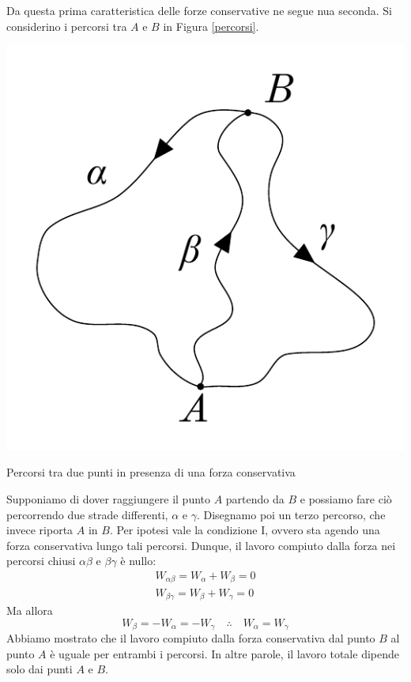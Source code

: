 \noindent Da questa prima caratteristica delle forze conservative ne segue nua
seconda. Si considerino i percorsi tra $A$ e $B$ in Figura \ref{percorsi}.
\begin{marginfigure}
    \centering
    \includegraphics[width = \marginparwidth]{figures/circ.pdf}
    \caption{Percorsi tra due punti in presenza di una forza conservativa}
    \label{percorsi}
\end{marginfigure}
Supponiamo di dover raggiungere il punto $A$ partendo da $B$ e possiamo fare
ciò percorrendo due strade differenti, $\alpha$ e $\gamma$. Disegnamo poi un
terzo percorso, che invece riporta $A$ in $B$.
Per ipotesi vale la condizione I, ovvero sta agendo una forza conservativa
lungo tali percorsi. Dunque, il lavoro compiuto dalla forza nei percorsi chiusi
$\alpha\beta$ e $\beta\gamma$ è nullo:
\begin{align*}
    W_{\alpha\beta} = W_\alpha + W_\beta = 0\\
    W_{\beta\gamma} = W_\beta + W_\gamma = 0
\end{align*}
Ma allora
\[ W_\beta = -W_\alpha = -W_\gamma \quad \therefore \quad W_\alpha = W_\gamma \]
Abbiamo mostrato che il lavoro compiuto dalla forza conservativa dal punto $B$
al punto $A$ è uguale per entrambi i percorsi. In altre parole, il lavoro totale
dipende solo dai punti $A$ e $B$.

